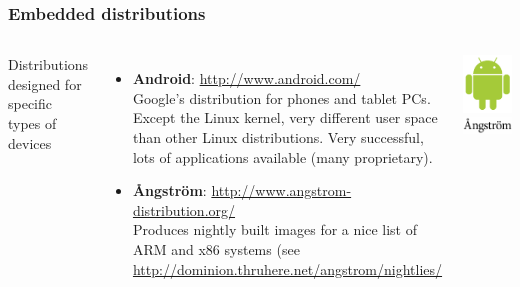 \begin{frame}
  \frametitle{Embedded distributions}
  \small
  \begin{columns}
    Distributions designed for specific types of devices
    \begin{itemize}
    \item {\bf Android}: \url{http://www.android.com/}\\
      Google's distribution for phones and tablet PCs.\\
      Except the Linux kernel, very different user space
      than other Linux distributions. Very successful,
      lots of applications available (many proprietary).
    \item {\bf Ångström}: \url{http://www.angstrom-distribution.org/}\\
      Produces nightly built images for a nice list of ARM and x86
      systems (see \url{http://dominion.thruhere.net/angstrom/nightlies/}
    \end{itemize}
    \includegraphics[width=\textwidth]{slides/sysdev-embedded-linux/android.png}\\
    \includegraphics[width=\textwidth]{slides/sysdev-embedded-linux/angstrom.png}\\
  \end{columns}
\end{frame}

